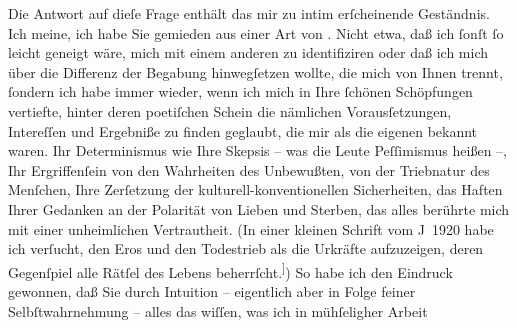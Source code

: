 \pstart
           Die Antwort auf dieſe Frage enthält das mir zu intim erſcheinende Geständnis. Ich
               meine, ich habe Sie gemieden aus einer Art von \label{K_L03887-2v}\label{K_L03887-2}. Nicht etwa, daß ich ſonſt
               ſo leicht geneigt {\pb}wäre, mich mit einem anderen zu
               identifiziren oder daß ich mich über die Differenz der Begabung hinwegſetzen wollte,
               die mich von Ihnen trennt, ſondern ich habe immer wieder, wenn ich mich in Ihre
               ſchönen Schöpfungen vertiefte, hinter deren poetiſchen Schein die nämlichen
               Vorausſetzungen, Intereſſen und Ergebniße zu finden geglaubt, die mir als die eigenen
               bekannt waren. Ihr Determinismus wie Ihre Skepsis – was die Leute Peſſimismus heißen
               –, Ihr Ergriffenſein von den Wahrheiten des Unbewußten, von der Triebnatur des
               Menſchen, Ihre Zerſetzung der kulturell-konventionellen Sicherheiten, das Haften
               Ihrer Gedanken an der Polarität von Lieben und Sterben, das alles berührte mich mit
               einer unheimlichen Vertrautheit. (In einer kleinen Schrift vom J 1920{ }\label{T_L03887-1v}\label{T_L03887-1}
               habe ich verſucht, den Eros und den Todestrieb als die Urkräfte aufzuzeigen, deren
               Gegenſpiel alle Rätſel des Lebens beherrſcht.\substVorne{}\textsuperscript{]}\substDazwischen{})\substHinten{} So habe ich den Eindruck gewonnen, daß Sie durch Intuition – eigentlich aber
               in Folge feiner Selbſtwahrnehmung – alles das wiſſen, was ich in mühſeligher Arbeit
